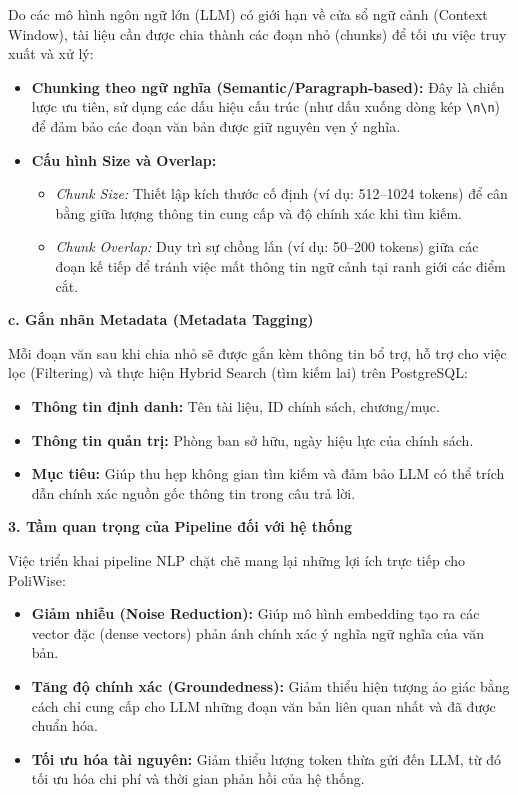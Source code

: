 \documentclass[12pt,a4paper]{report}
\begin{document}
Do các mô hình ngôn ngữ lớn (LLM) có giới hạn về cửa sổ ngữ cảnh (Context Window), tài liệu cần được chia thành các đoạn nhỏ (chunks) để tối ưu việc truy xuất và xử lý:
\begin{itemize}
    \item \textbf{Chunking theo ngữ nghĩa (Semantic/Paragraph-based):} Đây là chiến lược ưu tiên, sử dụng các dấu hiệu cấu trúc (như dấu xuống dòng kép \texttt{\textbackslash n\textbackslash n}) để đảm bảo các đoạn văn bản được giữ nguyên vẹn ý nghĩa.
    \item \textbf{Cấu hình Size và Overlap:}
    \begin{itemize}
        \item \textit{Chunk Size:} Thiết lập kích thước cố định (ví dụ: 512–1024 tokens) để cân bằng giữa lượng thông tin cung cấp và độ chính xác khi tìm kiếm.
        \item \textit{Chunk Overlap:} Duy trì sự chồng lấn (ví dụ: 50–200 tokens) giữa các đoạn kế tiếp để tránh việc mất thông tin ngữ cảnh tại ranh giới các điểm cắt.
    \end{itemize}
\end{itemize}

\textbf{c. Gắn nhãn Metadata (Metadata Tagging)}

Mỗi đoạn văn sau khi chia nhỏ sẽ được gắn kèm thông tin bổ trợ, hỗ trợ cho việc lọc (Filtering) và thực hiện Hybrid Search (tìm kiếm lai) trên PostgreSQL:
\begin{itemize}
    \item \textbf{Thông tin định danh:} Tên tài liệu, ID chính sách, chương/mục.
    \item \textbf{Thông tin quản trị:} Phòng ban sở hữu, ngày hiệu lực của chính sách.
    \item \textbf{Mục tiêu:} Giúp thu hẹp không gian tìm kiếm và đảm bảo LLM có thể trích dẫn chính xác nguồn gốc thông tin trong câu trả lời.
\end{itemize}

\textbf{3. Tầm quan trọng của Pipeline đối với hệ thống}

Việc triển khai pipeline NLP chặt chẽ mang lại những lợi ích trực tiếp cho PoliWise:
\begin{itemize}
    \item \textbf{Giảm nhiễu (Noise Reduction):} Giúp mô hình embedding tạo ra các vector đặc (dense vectors) phản ánh chính xác ý nghĩa ngữ nghĩa của văn bản.
    \item \textbf{Tăng độ chính xác (Groundedness):} Giảm thiểu hiện tượng ảo giác bằng cách chỉ cung cấp cho LLM những đoạn văn bản liên quan nhất và đã được chuẩn hóa.
    \item \textbf{Tối ưu hóa tài nguyên:} Giảm thiểu lượng token thừa gửi đến LLM, từ đó tối ưu hóa chi phí và thời gian phản hồi của hệ thống.
\end{itemize}
\end{document}
